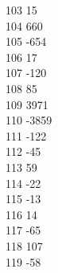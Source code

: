 { 103	15 \\
 104	660 \\
 105	-654 \\
 106	17 \\
 107	-120 \\
 108	85 \\
 109	3971 \\
 110	-3859 \\
 111	-122 \\
 112	-45 \\
 113	59 \\
 114	-22 \\
 115	-13 \\
 116	14 \\
 117	-65 \\
 118	107 \\
 119	-58 \\
}
